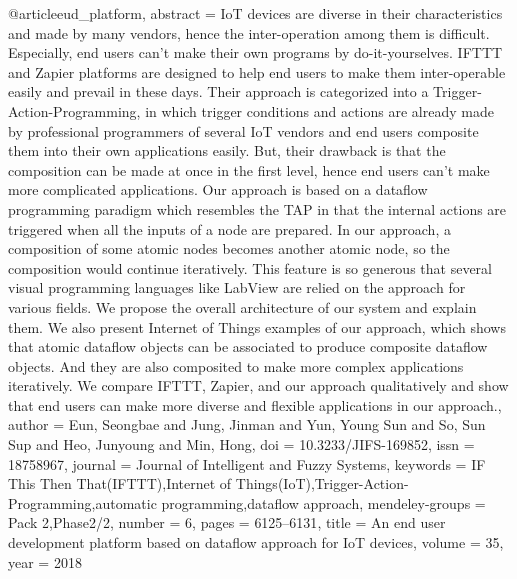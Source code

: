 @article{eud_platform,
    abstract = {IoT devices are diverse in their characteristics and made by many vendors, hence the inter-operation among them is difficult. Especially, end users can't make their own programs by do-it-yourselves. IFTTT and Zapier platforms are designed to help end users to make them inter-operable easily and prevail in these days. Their approach is categorized into a Trigger-Action-Programming, in which trigger conditions and actions are already made by professional programmers of several IoT vendors and end users composite them into their own applications easily. But, their drawback is that the composition can be made at once in the first level, hence end users can't make more complicated applications. Our approach is based on a dataflow programming paradigm which resembles the TAP in that the internal actions are triggered when all the inputs of a node are prepared. In our approach, a composition of some atomic nodes becomes another atomic node, so the composition would continue iteratively. This feature is so generous that several visual programming languages like LabView are relied on the approach for various fields. We propose the overall architecture of our system and explain them. We also present Internet of Things examples of our approach, which shows that atomic dataflow objects can be associated to produce composite dataflow objects. And they are also composited to make more complex applications iteratively. We compare IFTTT, Zapier, and our approach qualitatively and show that end users can make more diverse and flexible applications in our approach.},
    author = {Eun, Seongbae and Jung, Jinman and Yun, Young Sun and So, Sun Sup and Heo, Junyoung and Min, Hong},
    doi = {10.3233/JIFS-169852},
    issn = {18758967},
    journal = {Journal of Intelligent and Fuzzy Systems},
    keywords = {IF This Then That(IFTTT),Internet of Things(IoT),Trigger-Action-Programming,automatic programming,dataflow approach},
    mendeley-groups = {Pack 2,Phase2/2},
    number = {6},
    pages = {6125--6131},
    title = {{An end user development platform based on dataflow approach for IoT devices}},
    volume = {35},
    year = {2018}
}


